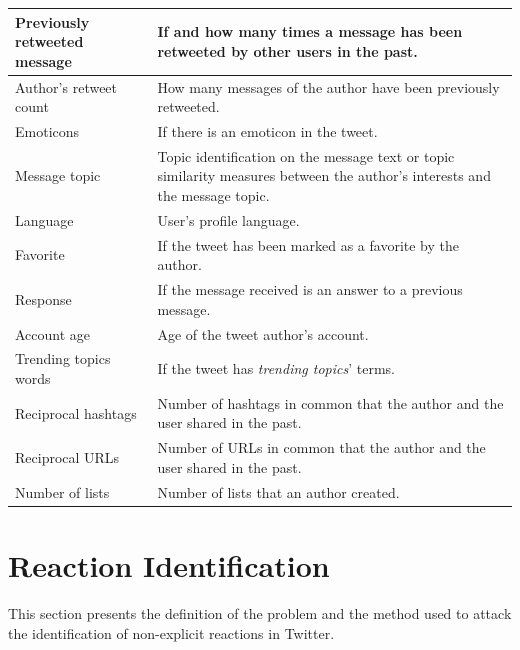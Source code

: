 \begin{table}[htbp]
\begin{tabular}{|>{\raggedright\centering\arraybackslash}m{1.5cm}|m{6.8cm}|}
		Previously retweeted message 												& If and how many times a message has been retweeted by other users in the past. \cite{Hong2011,Suh2010} \\ \hline
		Author's retweet count 															& How many messages of the author have been previously retweeted. \cite{Hong2011,Peng2011} \\ \hline
		Emoticons					 												& If there is an emoticon in the tweet. \cite{Liu2013} \\ \hline
		Message topic 																			& Topic identification on the message text or topic similarity measures between the author's interests and the message topic. \cite{Liu2013,Luo2013,Peng2011,Wang2012} \\ \hline
		Language 																						& User's profile language. \cite{Petrovic2011,Wang2012} \\ \hline
		Favorite 																						& If the tweet has been marked as a favorite by the author. \cite{Petrovic2011,Suh2010} \\ \hline
		Response 																						& If the message received is an answer to a previous message. \cite{Petrovic2011} \\ \hline
		Account age 																				& Age of the tweet author's account. \cite{Suh2010,Wang2012} \\ \hline
		Trending topics words 															& If the tweet has \textit{trending topics}' terms. \cite{Petrovic2011} \\ \hline
		Reciprocal hashtags 																& Number of hashtags in common that the author and the user shared in the past. \cite{Wang2012} \\ \hline
		Reciprocal URLs																			& Number of URLs in common that the author and the user shared in the past. \cite{Wang2012} \\ \hline
		Number of lists																			& Number of lists that an author created. \cite{Wang2012} \\ \hline
	\end{tabular}
	\label{tab:characteristics}
\end{table}

\section{Reaction Identification}

This section presents the definition of the problem and the method used to attack the identification of non-explicit reactions in Twitter.


